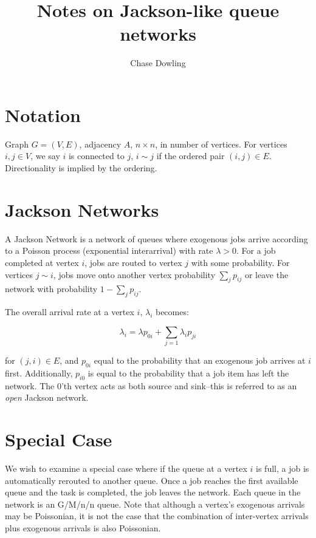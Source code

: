 \documentclass[]{article}
\title{Notes on Jackson-like queue networks}
\author{Chase Dowling}
\begin{document}
\maketitle

\section{Notation}

Graph $G = (V,E)$, adjacency $A$, $n \times n$, in number of vertices. For vertices $i,j \in V$, we say $i$ is connected to $j$, $i\sim j$ if the ordered pair $(i,j) \in E$. Directionality is implied by the ordering.

\section{Jackson Networks}

A Jackson Network is a network of queues where exogenous jobs arrive according to a Poisson process (exponential interarrival) with rate $\lambda > 0$.  For a job completed at vertex $i$, jobs are routed to vertex $j$ with some probability. For vertices $j\sim i$, jobs move onto another vertex probability $\sum_{j} p_{ij}$ or leave the network with probability $1 - \sum_{j} p_{ij}$. 

The overall arrival rate at a vertex $i$, $\lambda_i$ becomes:

\[\lambda_i = \lambda p_{0i} + \sum_{j=1} \lambda_i p_{ji}\]

for $(j,i) \in E$, and $p_{0i}$ equal to the probability that an exogenous job arrives at $i$ first. Additionally, $p_{i0}$ is equal to the probability that a job item has left the network. The 0'th vertex acts as both source and sink--this is referred to as an \emph{open} Jackson network.

\section{Special Case}

We wish to examine a special case where if the queue at a vertex $i$ is full, a job is automatically rerouted to another queue. Once a job reaches the first available queue and the task is completed, the job leaves the network. Each queue in the network is an G/M/n/n queue. Note that although a vertex's exogenous arrivals may be Poissonian, it is not the case that the combination of inter-vertex arrivals plus exogenous arrivals is also Poissonian. 
\end{document}
